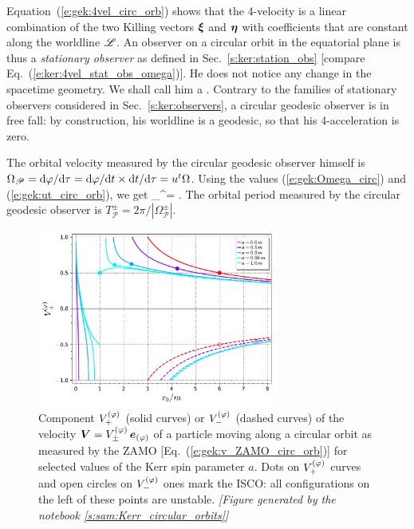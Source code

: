 Equation~(\ref{e:gek:4vel_circ_orb}) shows that the 4-velocity is a linear
combination of the two Killing vectors $\bm{\xi}$ and $\bm{\eta}$ with
coefficients that are constant along the worldline $\mathscr{L}$. An observer on
a circular orbit in the equatorial plane is thus a
\emph{stationary observer} as defined in Sec.~\ref{s:ker:station_obs}
[compare Eq.~(\ref{e:ker:4vel_stat_obs_omega})]. He does not notice any change in the spacetime
geometry. We shall call him a .
Contrary to the families of stationary observers considered in Sec.~\ref{s:ker:observers},
a circular geodesic observer is in free fall: by construction, his worldline is a geodesic, so that
his 4-acceleration is zero.

The orbital velocity measured by the circular geodesic observer himself is
$\Omega_{\mathscr{P}} = \mathrm{d}\varphi / \mathrm{d}\tau = \mathrm{d}\varphi / \mathrm{d} t \times \mathrm{d} t / \mathrm{d} \tau = u^t \Omega$.
Using the values (\ref{e:gek:Omega_circ}) and (\ref{e:gek:ut_circ_orb}), we get
\be
    \Omega_{}^\pm = \pm {} .
\ee
The orbital period measured by the circular geodesic observer is
$T_{\mathscr{P}}^\pm = 2\pi / |\Omega_{\mathscr{P}}^\pm |$.


\begin{figure}
\centerline{\includegraphics[width=0.7\textwidth]{gek_v_zamo_circ_orb.pdf}}
\caption[]{\label{f:gek:v_zamo_circ_orb} \footnotesize
Component $V^{(\varphi)}_+$  (solid curves) or $V^{(\varphi)}_-$
(dashed curves) of the velocity $\bm{V} = V^{(\varphi)}_\pm \, \bm{e}_{(\varphi)}$
of a particle moving along a circular
orbit as measured by the ZAMO [Eq.~(\ref{e:gek:v_ZAMO_circ_orb})]
for selected values of the Kerr spin parameter $a$.
Dots on $V^{(\varphi)}_+$  curves and open circles on $V^{(\varphi)}_-$  ones mark the ISCO: all
configurations on the left of these points are unstable.
\textsl{[Figure generated by the notebook \ref{s:sam:Kerr_circular_orbits}]}
}
\end{figure}


